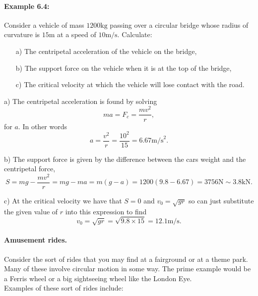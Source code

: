 \documentclass[a4paper,12pt]{book}
\begin{document}
\paragraph{Example 6.4:} Consider a vehicle of mass $1200\text{kg}$ passing over a circular bridge whose radius of curvature is $15\text{m}$ at a speed of $10\text{m/s}$. Calculate:
\begin{itemize}
\setlength{\itemsep}{-5pt}
    \item[a)] The centripetal acceleration of the vehicle on the bridge,
    \item[b)] The support force on the vehicle when it is at the top of the bridge,
    \item[c)] The critical velocity at which the vehicle will lose contact with the road.
\end{itemize} 


a) The centripetal acceleration is found by solving 
\begin{equation*}
ma=F_{c}=\frac{mv^{2}}{r},
\end{equation*}
for $a$. In other words
\begin{equation*}
a=\frac{v^{2}}{r}=\frac{10^{2}}{15}=6.67\text{m/s}^{2}.
\end{equation*}

b) The support force is given by the difference between the cars weight and the centripetal force,
\begin{equation*}
S=mg-\frac{mv^{2}}{r}=mg-ma=m\left(g-a\right)=1200\left(9.8-6.67\right)=3756\text{N}\sim 3.8\text{kN}.
\end{equation*}

c) At the critical velocity we have that $S=0$ and $v_{0}=\sqrt{gr}$ so can just substitute the given value of $r$ into this expression to find
\begin{equation*}
v_{0}=\sqrt{gr}=\sqrt{9.8\times 15}=12.1\text{m/s}.
\end{equation*}


\paragraph{Amusement rides.} Consider the sort of rides that you may find at a fairground or at a theme park. Many of these involve circular motion in some way. The prime example would be a Ferris wheel or a big sightseeing wheel like the London Eye.\\

Examples of these sort of rides include: 
\end{document}
